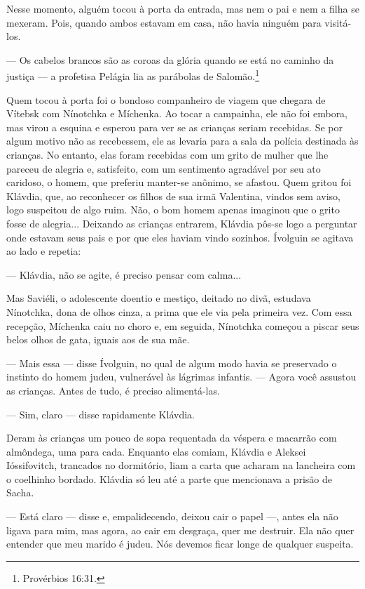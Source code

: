 Nesse momento, alguém tocou à porta da entrada, mas nem o pai e nem a
filha se mexeram. Pois, quando ambos estavam em casa, não havia ninguém
para visitá-los.

--- Os cabelos brancos são as coroas da glória quando se está no caminho
da justiça --- a profetisa Pelágia lia as parábolas de
Salomão.\footnote{Provérbios 16:31.}

Quem tocou à porta foi o bondoso companheiro de viagem que chegara de
Vítebsk com Nínotchka e Míchenka. Ao tocar a campainha, ele não foi
embora, mas virou a esquina e esperou para ver se as crianças seriam
recebidas. Se por algum motivo não as recebessem, ele as levaria para a
sala da polícia destinada às crianças. No entanto, elas foram recebidas
com um grito de mulher que lhe pareceu de alegria e, satisfeito, com um
sentimento agradável por seu ato caridoso, o homem, que preferiu
manter-se anônimo, se afastou. Quem gritou foi Klávdia, que, ao
reconhecer os filhos de sua irmã Valentina, vindos sem aviso, logo
suspeitou de algo ruim. Não, o bom homem apenas imaginou que o grito
fosse de alegria... Deixando as crianças entrarem, Klávdia pôs-se logo a
perguntar onde estavam seus pais e por que eles haviam vindo sozinhos.
Ívolguin se agitava ao lado e repetia:

--- Klávdia, não se agite, é preciso pensar com calma...

Mas Saviéli, o adolescente doentio e mestiço, deitado no divã, estudava
Nínotchka, dona de olhos cinza, a prima que ele via pela primeira vez.
Com essa recepção, Míchenka caiu no choro e, em seguida, Nínotchka
começou a piscar seus belos olhos de gata, iguais aos de sua mãe.

--- Mais essa --- disse Ívolguin, no qual de algum modo havia se
preservado o instinto do homem judeu, vulnerável às lágrimas infantis.
--- Agora você assustou as crianças. Antes de tudo, é preciso
alimentá-las.

--- Sim, claro --- disse rapidamente Klávdia.

Deram às crianças um pouco de sopa requentada da véspera e macarrão com
almôndega, uma para cada. Enquanto elas comiam, Klávdia e Aleksei
Ióssifovitch, trancados no dormitório, liam a carta que acharam na
lancheira com o coelhinho bordado. Klávdia só leu até a parte que
mencionava a prisão de Sacha.

--- Está claro --- disse e, empalidecendo, deixou cair o papel ---,
antes ela não ligava para mim, mas agora, ao cair em desgraça, quer me
destruir. Ela não quer entender que meu marido é judeu. Nós devemos
ficar longe de qualquer suspeita.

